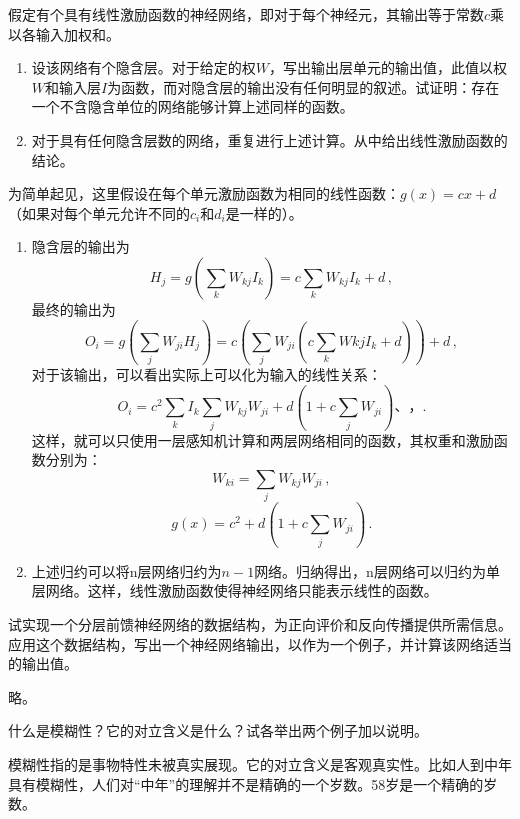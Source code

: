 \begin{question}
假定有个具有线性激励函数的神经网络，即对于每个神经元，其输出等于常数$c$乘以各输入加权和。
	\begin{enumerate}
		\item 设该网络有个隐含层。对于给定的权$W$，写出输出层单元的输出值，此值以权$W$和输入层$I$为函数，而对隐含层的输出没有任何明显的叙述。试证明：存在一个不含隐含单位的网络能够计算上述同样的函数。
		\item 对于具有任何隐含层数的网络，重复进行上述计算。从中给出线性激励函数的结论。
	\end{enumerate}
\end{question}
\begin{solution}
为简单起见，这里假设在每个单元激励函数为相同的线性函数：$g(x)=cx+d$（如果对每个单元允许不同的$c_i$和$d_i$是一样的）。
	\begin{enumerate}
	\item 隐含层的输出为
	\[ H_j = g \left( \sum\limits_k W_{kj} I_k \right) = c \sum\limits_k W_{kj} I_k + d \, ,\]
	最终的输出为
	\[ O_i = g \left( \sum\limits_j W_{ji} H_j \right) = c \left( \sum\limits_j W_{ji} \left( c \sum\limits_k W{kj} I_k + d \right) \right) + d \, ,\]
	对于该输出，可以看出实际上可以化为输入的线性关系：
	\[ O_i = c^2 \sum\limits_k I_k \sum\limits_j W_{kj} W_{ji} + d \left( 1 + c \sum\limits_j W_{ji} \right) 、， . \]
	这样，就可以只使用一层感知机计算和两层网络相同的函数，其权重和激励函数分别为：
	\[ W_{ki} = \sum\limits_j W_{kj} W_{ji} \, ,\]
	\[ g(x) = c^2 + d \left( 1+c \sum\limits_j W_{ji} \right) \, .\]
	\item 上述归约可以将n层网络归约为$n-1$网络。归纳得出，n层网络可以归约为单层网络。这样，线性激励函数使得神经网络只能表示线性的函数。
	\end{enumerate}
\end{solution}

\begin{question}
试实现一个分层前馈神经网络的数据结构，为正向评价和反向传播提供所需信息。应用这个数据结构，写出一个神经网络输出，以作为一个例子，并计算该网络适当的输出值。
\end{question}
\begin{solution}
略。
\end{solution}

\begin{question}
什么是模糊性？它的对立含义是什么？试各举出两个例子加以说明。
\end{question}
\begin{solution}
模糊性指的是事物特性未被真实展现。它的对立含义是客观真实性。比如人到中年具有模糊性，人们对``中年''的理解并不是精确的一个岁数。58岁是一个精确的岁数。
\end{solution}

